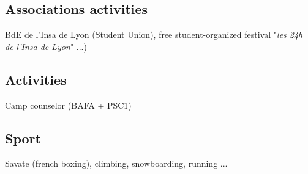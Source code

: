 	\subsection{Associations activities}
		{BdE de l'Insa de Lyon (Student Union), free student-organized festival "\textit{les 24h de l'Insa de Lyon}" ...)}
		
	\subsection{Activities}
		{Camp counselor (BAFA + PSC1)}
		
	\subsection{Sport}
		{Savate (french boxing), climbing, snowboarding, running ...}		

